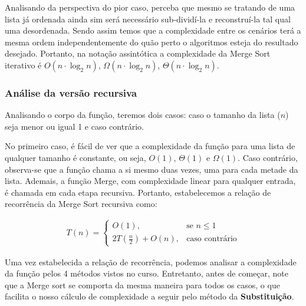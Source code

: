 Analisando da perspectiva do pior caso, perceba que mesmo se tratando de uma lista já ordenada ainda sim será necessário sub-dividí-la e reconstruí-la tal qual uma desordenada. Sendo assim temos que a complexidade entre os cenários terá a mesma ordem independentemente do quão perto o algoritmos esteja do resultado desejado. Portanto, na notação assintótica a complexidade da Merge Sort iterativo é $O(n \cdot \log_2{n})$, $\Omega(n \cdot \log_2{n})$, $\Theta(n \cdot \log_2{n})$.

\subsubsection{Análise da versão recursiva}

Analisando o corpo da função, teremos dois casos: caso o tamanho da lista ($n$) seja menor ou igual 1 e caso contrário.

\begin{algorithm}
	\begin{algorithmic}[0]
		 \Return
		\EndIf
		\State {}
	\end{algorithmic}
\end{algorithm}
\FloatBarrier

No primeiro caso, é fácil de ver que a complexidade da função para uma lista de qualquer tamanho é constante, ou seja, $O(1)$, $\Theta(1)$ e $\Omega(1)$. Caso contrário, observa-se que a função chama a si mesmo duas vezes, uma para cada metade da lista. Ademais, a função Merge, com complexidade linear para qualquer entrada, é chamada em cada etapa recursiva. Portanto, estabelecemos a relação de recorrência da Merge Sort recursiva como:


\begin{align*}
	T(n) =
	\begin{cases}
		O(1),                   & \text{se $n \leq 1$}  \\
		2T(\frac{n}{2}) + O(n), & \text{caso contrário}
	\end{cases}
\end{align*}

Uma vez estabelecida a relação de recorrência, podemos analisar a complexidade da função pelos 4 métodos vistos no curso. Entretanto, antes de começar, note que a Merge sort se comporta da mesma maneira para todos os casos, o que facilita o nosso cálculo de complexidade a seguir pelo método da \textbf{Substituição}.

